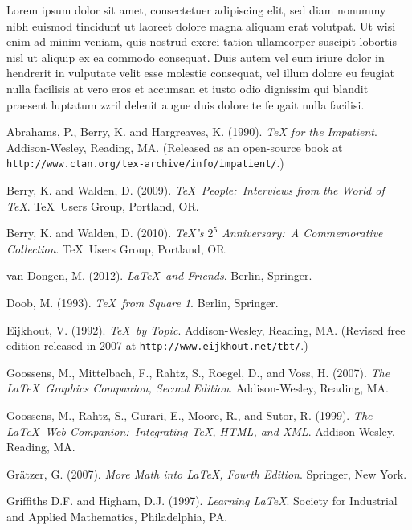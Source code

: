 \documentclass[oldfontcommands,6x9]{pupbook}
\begin{document}
Lorem ipsum dolor sit amet, consectetuer adipiscing elit, sed diam
nonummy nibh euismod tincidunt ut laoreet dolore magna aliquam erat
volutpat. Ut wisi enim ad minim veniam, quis nostrud exerci tation
ullamcorper suscipit lobortis nisl ut aliquip ex ea commodo consequat.
Duis autem vel eum iriure dolor in hendrerit in vulputate velit esse
molestie consequat, vel illum dolore eu feugiat nulla facilisis at vero
eros et accumsan et iusto odio dignissim qui blandit praesent luptatum
zzril delenit augue duis dolore te feugait nulla facilisi. 

\begin{thebibliography}{1}
Abrahams, P., Berry, K. and Hargreaves, K. (1990). \textit{{\TeX} for the Impatient}.
Addison-Wesley, Reading, MA. (Released as an open-source book at \texttt{http://www.ctan.org/tex-archive/info/impatient/}.)
  
Berry, K. and Walden, D. (2009). \textit{\TeX\ People:\ Interviews from the World of \TeX}. \TeX\ Users 
Group, Portland, OR. 

Berry, K. and Walden, D. (2010). \textit{\TeX's $\mathit{2^5}$ Anniversary:\ A Commemorative Collection}. \TeX\ Users 
Group, Portland, OR. 


van Dongen, M. (2012). \textit{\LaTeX\ and Friends}. Berlin, Springer.

Doob, M. (1993). \textit{\TeX\ from Square 1}. Berlin, Springer.

Eijkhout, V. (1992). \textit{\TeX\ by Topic}. Addison-Wesley, Reading, MA. (Revised free edition
released in 2007 at \texttt{http://www.eijkhout.net/tbt/}.)

Goossens, M., Mittelbach, F., Rahtz, S., Roegel, D., and Voss, H. (2007). \textit{The \LaTeX\ Graphics Companion, Second Edition}. 
Addison-Wesley, Reading, MA.

Goossens, M., Rahtz, S., Gurari, E., Moore, R., and Sutor, R. (1999). \textit{The \LaTeX\ Web Companion:\ Integrating \TeX, HTML, and XML}. 
Addison-Wesley, Reading, MA.

Gr\"atzer, G. (2007). \textit{More Math into \LaTeX, Fourth Edition}. Springer, New York. 

Griffiths D.F. and Higham, D.J. (1997). \textit{Learning \LaTeX}. Society for Industrial
and Applied Mathematics, Philadelphia, PA.


\end{thebibliography}
\end{document}
